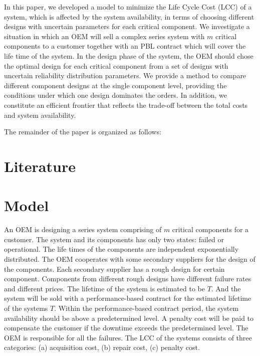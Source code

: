 \documentclass[preprint,12pt]{elsarticle}
\begin{document}

In this paper, we developed a model to minimize the Life Cycle Cost (LCC) of a system, which is affected by the system availability, in terms of choosing different designs with uncertain parameters for each critical component. We investigate a situation in which an OEM will sell a complex series system with $m$ critical components to a customer together with an PBL contract which will cover the life time of the system. In the design phase of the system, the OEM should chose the optimal design for each critical component from a set of designs with uncertain reliability distribution parameters. We provide a method to compare different component designs at the single component level, providing the conditions under which one design dominates the orders. In addition, we constitute an efficient frontier that reflects the trade-off between the total costs and system availability.



The remainder of the paper is organized as follows:





\section{Literature}

\section{Model}
An OEM is designing a series system comprising of $m$ critical components for a customer. The system and its components has only two states: failed or operational. The life times of the components are independent exponentially distributed. The OEM cooperates with some secondary suppliers for the design of the components. Each secondary supplier has a rough design for certain component. Components from different rough designs have different failure rates and different prices. The lifetime of the system is estimated to be $T$. And the system will be sold with a performance-based contract for the estimated lifetime of the systems $T$. Within the performance-based contract period, the system availability should be above a predetermined level. A penalty cost will be paid to compensate the customer if the downtime exceeds the predetermined level. The OEM is responsible for all the failures. The LCC of the systems consists of three categories: (a) acquisition cost, (b) repair cost, (c) penalty cost.
\end{document}
